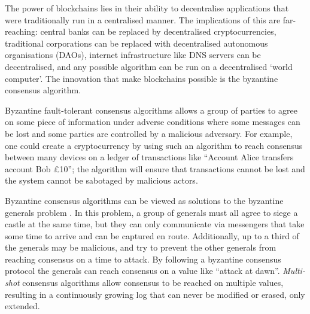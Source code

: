 

The power of blockchains lies in their ability to decentralise applications that were traditionally run in a centralised manner. The implications of this are far-reaching: central banks can be replaced by decentralised cryptocurrencies, traditional corporations can be replaced with decentralised autonomous organisations (DAOs), internet infrastructure like DNS servers can be decentralised, and any possible algorithm can be run on a decentralised `world computer'. The innovation that make blockchains possible is the byzantine consensus algorithm.

Byzantine fault-tolerant consensus algorithms allows a group of parties to agree on some piece of information under adverse conditions where some messages can be lost and some parties are controlled by a malicious adversary. For example, one could create a cryptocurrency by using such an algorithm to reach consensus between many devices on a ledger of transactions like ``Account Alice transfers account Bob £10''; the algorithm will ensure that transactions cannot be lost and the system cannot be sabotaged by malicious actors.

Byzantine consensus algorithms can be viewed as solutions to the byzantine generals problem \cite{lamport_byzantine_nodate}. In this problem, a group of generals must all agree to siege a castle at the same time, but they can only communicate via messengers that take some time to arrive and can be captured en route. Additionally, up to a third of the generals may be malicious, and try to prevent the other generals from reaching consensus on a time to attack. By following a byzantine consensus protocol the generals can reach consensus on a value like ``attack at dawn''. \textit{Multi-shot} consensus algorithms allow consensus to be reached on multiple values, resulting in a continuously growing log that can never be modified or erased, only extended.

